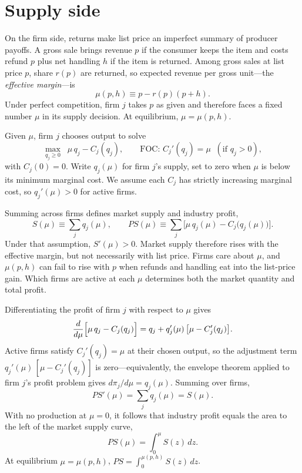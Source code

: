 \documentclass[11pt]{article}
\begin{document}
\section{Supply side}

On the firm side, returns make list price an imperfect summary of producer
payoffs.  A gross sale brings revenue $p$ if the consumer keeps the item and
costs refund $p$ plus net handling $h$ if the item is returned.  Among gross
sales at list price $p$, share $r(p)$ are returned, so expected revenue per
gross unit---the \emph{effective margin}---is
\begin{equation}
  \mu(p,h) \equiv p - r(p)(p+h).
  \label{eq:mu-def}
\end{equation}
Under perfect competition, firm $j$ takes $p$ as given and therefore faces a
fixed number $\mu$ in its supply decision.  At equilibrium, $\mu=\mu(p,h)$.

Given $\mu$, firm $j$ chooses output to solve
\[
  \max_{q_j \geq 0}\;\; \mu\,q_j - C_j(q_j),
  \qquad
  \text{FOC: } C_j'(q_j)=\mu \;\;(\text{if } q_j>0),
\]
with $C_j(0)=0$.  Write $q_j(\mu)$ for firm $j$'s supply, set to zero when
$\mu$ is below its minimum marginal cost.  We assume each $C_j$ has strictly
increasing marginal cost, so $q_j'(\mu)>0$ for active firms.

Summing across firms defines market supply and industry profit,
\begin{equation}
  S(\mu) \equiv \sum_j q_j(\mu),
  \qquad
  PS(\mu) \equiv \sum_j \bigl[\mu\,q_j(\mu)-C_j\bigl(q_j(\mu)\bigr)\bigr].
  \label{eq:agg-def}
\end{equation}
Under that assumption, $S'(\mu)>0$.  Market supply therefore rises with the
effective margin, but not necessarily with list price.  Firms care about
$\mu$, and $\mu(p,h)$ can fail to rise with $p$ when refunds and handling
eat into the list-price gain.  Which firms are active at each $\mu$
determines both the market quantity and total profit.

Differentiating the profit of firm $j$ with respect to $\mu$ gives
\[
  \frac{d}{d\mu}\Bigl[\mu\,q_j-C_j(q_j)\Bigr]
  = q_j + q_j'(\mu)\,\bigl[\mu-C_j'(q_j)\bigr].
\]
Active firms satisfy $C_j'(q_j)=\mu$ at their chosen output, so the adjustment
term $q_j'(\mu)\,[\mu-C_j'(q_j)]$ is zero---equivalently, the envelope theorem
applied to firm $j$'s profit problem gives $d\pi_j/d\mu=q_j(\mu)$.  Summing
over firms,
\[
  PS'(\mu)=\sum_j q_j(\mu)=S(\mu).
\]
With no production at $\mu=0$, it follows that industry profit equals the area
to the left of the market supply curve,
\begin{equation}
  PS(\mu)=\int_0^\mu S(z)\,dz.
  \label{eq:PS-integral}
\end{equation}
At equilibrium $\mu=\mu(p,h)$,
$PS=\int_0^{\mu(p,h)}S(z)\,dz$.
\end{document}
